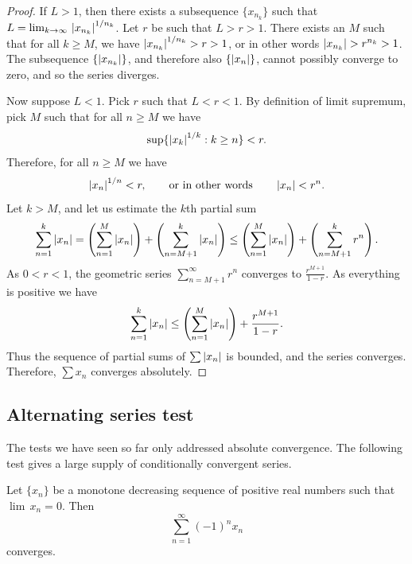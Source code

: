 \begin{proof}
If $L > 1$, then there exists a subsequence $\{ x_{n_k} \}$ such that
$L = \lim_{k\to\infty} \, {\left\lvert {x_{n_k}} \right\rvert}^{1/n_k}$.  Let
$r$ be such that $L > r > 1$.  There exists an $M$ such
that for all $k \geq M$, we have 
${\left\lvert {x_{n_k}} \right\rvert}^{1/n_k} > r > 1$, or in other words
$\left\lvert {x_{n_k}} \right\rvert > r^{n_k} > 1$.  The
subsequence 
$\{ \left\lvert {x_{n_k}} \right\rvert \}$, and therefore also
$\{ \left\lvert {x_{n}} \right\rvert \}$, cannot possibly converge to zero, and so the series
diverges.

Now suppose $L < 1$.  Pick $r$ such that $L < r < 1$.
By definition of limit supremum,
pick $M$ such that for all $n \geq M$ we have 
\begin{equation*}
\sup \{ {\left\lvert {x_k} \right\rvert}^{1/k} : k \geq n \} < r .
\end{equation*}
Therefore, for all $n \geq M$ we have
\begin{equation*}
{\left\lvert {x_n} \right\rvert}^{1/n} < r , \qquad \text{or in other words} \qquad \left\lvert {x_n} \right\rvert < r^n .
\end{equation*}
Let $k > M$, and let us estimate the $k$th partial sum
\begin{equation*}
\sum_{n=1}^k \left\lvert {x_n} \right\rvert = 
\left( \sum_{n=1}^M \left\lvert {x_n} \right\rvert \right) + 
\left( \sum_{n=M+1}^k \left\lvert {x_n} \right\rvert \right)
\leq
\left( \sum_{n=1}^M \left\lvert {x_n} \right\rvert \right) + 
\left( \sum_{n=M+1}^k r^n \right) .
\end{equation*}
As $0 < r < 1$,
the geometric series $\sum_{n=M+1}^\infty r^n$ converges to
$\frac{r^{M+1}}{1-r}$.  As everything is positive we have
\begin{equation*}
\sum_{n=1}^k \left\lvert {x_n} \right\rvert 
\leq
\left( \sum_{n=1}^M \left\lvert {x_n} \right\rvert \right) + 
\frac{r^{M+1}}{1-r} .
\end{equation*}
Thus the sequence of partial sums of $\sum \left\lvert {x_n} \right\rvert$ is bounded, and
the series converges.  Therefore, $\sum x_n$ converges absolutely.
\end{proof}

\subsection{Alternating series test}

The tests we have seen so far only addressed absolute convergence.  The
following test gives a large supply of conditionally convergent series.

\begin{prop}
Let $\{ x_n \}$ be a monotone decreasing sequence of positive real numbers such
that $\lim\, x_n = 0$.  Then
\begin{equation*}
\sum_{n=1}^\infty {(-1)}^n x_n
\end{equation*}
converges.
\end{prop}

